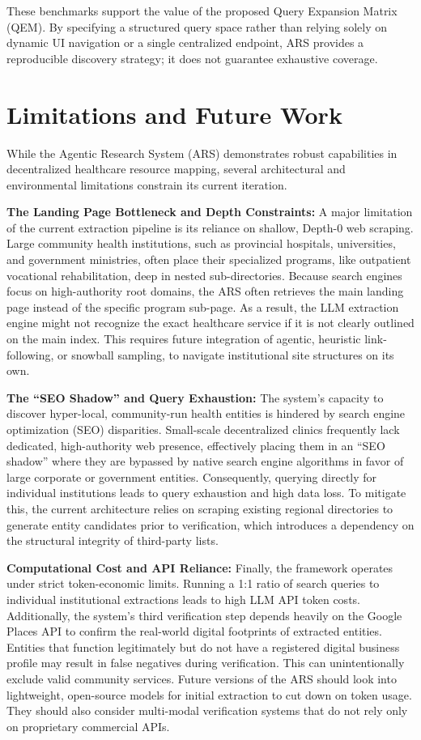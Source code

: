 \documentclass[12pt,oneside]{report}
\begin{document}
These benchmarks support the value of the proposed Query Expansion Matrix (QEM). By specifying a structured query space rather than relying solely on dynamic UI navigation or a single centralized endpoint, ARS provides a reproducible discovery strategy; it does not guarantee exhaustive coverage.

\section{Limitations and Future Work}

While the Agentic Research System (ARS) demonstrates robust capabilities in decentralized healthcare resource mapping, several architectural and environmental limitations constrain its current iteration.

\textbf{The Landing Page Bottleneck and Depth Constraints:} A major limitation of the current extraction pipeline is its reliance on shallow, Depth-0 web scraping. Large community health institutions, such as provincial hospitals, universities, and government ministries, often place their specialized programs, like outpatient vocational rehabilitation, deep in nested sub-directories. Because search engines focus on high-authority root domains, the ARS often retrieves the main landing page instead of the specific program sub-page. As a result, the LLM extraction engine might not recognize the exact healthcare service if it is not clearly outlined on the main index. This requires future integration of agentic, heuristic link-following, or snowball sampling, to navigate institutional site structures on its own.

\textbf{The ``SEO Shadow'' and Query Exhaustion:} The system's capacity to discover hyper-local, community-run health entities is hindered by search engine optimization (SEO) disparities. Small-scale decentralized clinics frequently lack dedicated, high-authority web presence, effectively placing them in an ``SEO shadow'' where they are bypassed by native search engine algorithms in favor of large corporate or government entities. Consequently, querying directly for individual institutions leads to query exhaustion and high data loss. To mitigate this, the current architecture relies on scraping existing regional directories to generate entity candidates prior to verification, which introduces a dependency on the structural integrity of third-party lists. 

\textbf{Computational Cost and API Reliance:} Finally, the framework operates under strict token-economic limits. Running a 1:1 ratio of search queries to individual institutional extractions leads to high LLM API token costs. Additionally, the system's third verification step depends heavily on the Google Places API to confirm the real-world digital footprints of extracted entities. Entities that function legitimately but do not have a registered digital business profile may result in false negatives during verification. This can unintentionally exclude valid community services. Future versions of the ARS should look into lightweight, open-source models for initial extraction to cut down on token usage. They should also consider multi-modal verification systems that do not rely only on proprietary commercial APIs.
\end{document}
